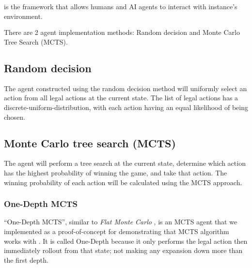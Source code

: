 \section{\RootAI}
\RootAI{} is the framework that allows humans and AI agents to interact with \RootOurs{} instance's environment.

There are 2 agent implementation methods: Random decision and Monte Carlo Tree Search (MCTS).

\subsection{Random decision}
The agent constructed using the random decision method will uniformly select an action from all legal actions at the current state. The list of legal actions has a \gls{discrete-uniform-distribution}, with each action having an equal likelihood of being chosen. %


\subsection{Monte Carlo tree search (MCTS)} %
The agent will perform a tree search at the current state, determine which action has the highest probability of winning the game, and take that action. The winning probability of each action will be calculated using the MCTS approach.


\subsubsection{One-Depth MCTS}
``One-Depth MCTS'', similar to \textit{Flat Monte Carlo} \cite{mcts-survey}, is an MCTS agent that we implemented as a proof-of-concept for demonstrating that MCTS algorithm works with \RootB{}. It is called One-Depth because it only performs the legal action then immediately rollout from that state; not making any expansion down more than the first depth.

